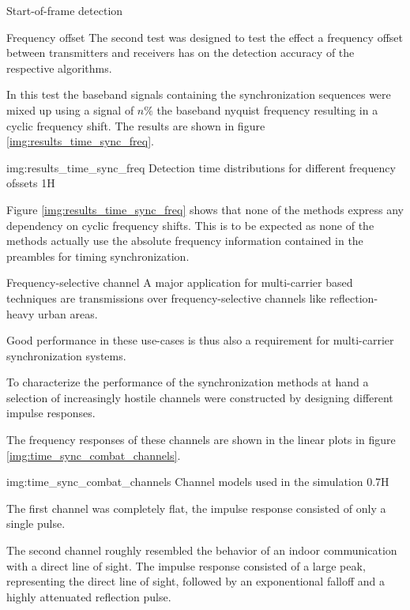 \begin{subchapter}{Start-of-frame detection}
  \begin{subsubchapter}{Frequency offset}
    The second test was designed to test the effect a frequency offset
    between transmitters and receivers has on the detection accuracy
    of the respective algorithms.

    In this test the baseband signals containing the synchronization
    sequences were mixed up using a signal of $n\si{\percent}$ the
    baseband nyquist frequency resulting in a cyclic frequency shift.
    The results are shown in figure \ref{img:results_time_sync_freq}.

                 {img:results_time_sync_freq}
                 {Detection time distributions for different frequency ofssets}
                 {1}{H}

    Figure \ref{img:results_time_sync_freq} shows that none of the
    methods express any dependency on cyclic frequency shifts.
    This is to be expected as none of the methods actually use
    the absolute frequency information contained in the preambles
    for timing synchronization.
  \end{subsubchapter}

  \begin{subsubchapter}{Frequency-selective channel}
    A major application for multi-carrier based techniques
    are transmissions over frequency-selective channels
    like reflection-heavy urban areas.

    Good performance in these use-cases is thus also a
    requirement for multi-carrier synchronization systems.

    To characterize the performance of the synchronization
    methods at hand a selection of increasingly hostile
    channels were constructed by designing different
    impulse responses.

    The frequency responses of these channels are shown
    in the linear plots in figure \ref{img:time_sync_combat_channels}.

                 {img:time_sync_combat_channels}
                 {Channel models used in the simulation}
                 {0.7}{H}

    The first channel was completely flat, the impulse response
    consisted of only a single pulse.

    The second channel roughly resembled the behavior of
    an indoor communication with a direct line of sight.
    The impulse response consisted of a large peak, representing the
    direct line of sight, followed by an exponentional falloff and a
    highly attenuated reflection pulse.


\end{subsubchapter}
\end{subchapter}
